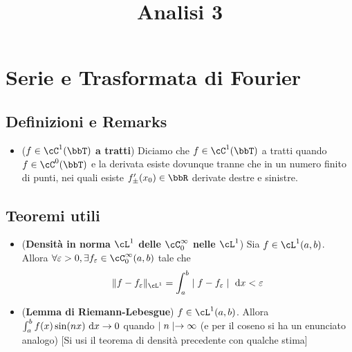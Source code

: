 \documentclass[a4paper,NoNotes,GeneralMath]{stdmdoc}
\newcommand{\CT}[1]{\cC^{#1}(\bbT)}
\begin{document}
	\title{Analisi 3}
	
	\section*{Serie e Trasformata di Fourier}
        \subsection*{Definizioni e Remarks}
        \begin{itemize}
          \item ({\bf $f \in \CT{1}$ a tratti}) Diciamo che $f \in \CT{1}$ a tratti quando $f \in \CT{0}$ e la derivata esiste dovunque tranne che in un numero finito di punti, nei quali esiste $f'_\pm (x_0) \in \bbR$ derivate destre e sinistre.
        \end{itemize}

        \subsection*{Teoremi utili}
        \begin{itemize}
          \item ({\bf Densità in norma $\cL^1$ delle $\cC^\infty_0$ nelle $\cL^1$}) Sia $f \in \cL^1(a, b)$. Allora $\forall \varepsilon > 0, \exists f_\varepsilon \in \cC^\infty_0(a,b)$ tale che $$ \norm{f - f_\varepsilon}_{\cL^1} = \int_a^b \abs{f - f_\varepsilon} \de x  < \varepsilon $$
          \item ({\bf Lemma di Riemann-Lebesgue}) $f \in \cL^1(a, b)$. Allora $\int_a^b f(x) \sin(n x) \de x \rar 0$ quando $\mid n \mid \rightarrow \infty$ (e per il coseno si ha un enunciato analogo) [Si usi il teorema di densità precedente con qualche stima]
        \end{itemize}
        
\end{document}
